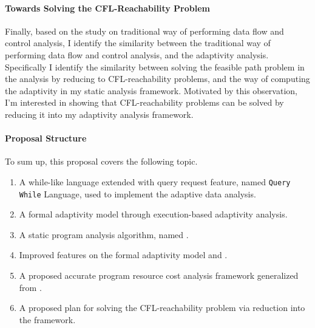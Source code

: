    \paragraph*{Towards Solving the CFL-Reachability Problem}
Finally, based on the study on traditional way of performing data flow and control analysis,
I identify the similarity between the traditional way of performing data flow and control analysis, and the 
   adaptivity analysis.  
   Specifically I identify the similarity between 
   solving the feasible path problem in the analysis by reducing to CFL-reachability problems,
   and the way of computing the adaptivity in my static analysis framework.
   Motivated by this observation, 
   I'm interested in showing that
   CFL-reachability problems can be solved by reducing it into my adaptivity analysis framework.


\paragraph*{Proposal Structure}
To sum up, this proposal covers the following topic.
\begin{enumerate}
\item A while-like language extended with query request feature, named {\tt Query While} Language, 
used to implement 
the adaptive data analysis.
\item A formal adaptivity model through execution-based adaptivity analysis.
\item A static program analysis algorithm, named {\THESYSTEM}.
\item Improved features on the formal adaptivity model and {\THESYSTEM}.
\item A proposed accurate program resource cost analysis framework generalized from {\THESYSTEM}.
\item A proposed plan for solving the CFL-reachability problem via reduction into the {\THESYSTEM} framework.
\end{enumerate}